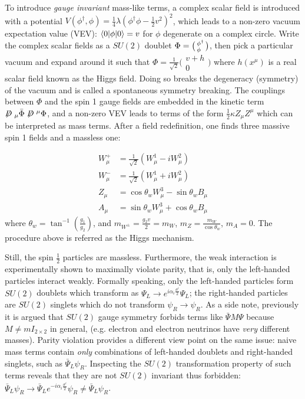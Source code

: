 To introduce \emph{gauge invariant} mass-like terms,
a complex scalar field is introduced with a potential
$V(\phi^\dagger, \phi) = \frac{1}{4}\lambda \left(\phi^\dagger \phi - \frac{1}{2}v^2\right)^2$,
which leads to a non-zero vacuum expectation value (VEV):
$\langle0\rvert\phi\lvert0\rangle = v$ for $\phi$ degenerate on a complex circle.
Write the complex scalar fields as a $SU(2)$ doublet
$\Phi = \bigl(\begin{smallmatrix} \phi^\dagger \\ \phi^{\hphantom{\dagger}} \end{smallmatrix}\bigr)$,
then pick a particular vacuum and expand around it such that
$\Phi = \frac{1}{\sqrt{2}} \bigl(\begin{smallmatrix} v + h \\ 0 \end{smallmatrix}\bigr)$
where $h(x^\mu)$ is a real scalar field known as the Higgs field.
Doing so breaks the degeneracy (symmetry) of the vacuum and is called a
spontaneous symmetry breaking.
The couplings between $\Phi$ and the spin 1 gauge fields are embedded in the
kinetic term $\fsl{D}_\mu \bar\Phi \fsl{D}^\mu \Phi$,
and a non-zero VEV leads to terms of the form $\frac{1}{2}\kappa Z_\mu Z^\mu$ which
can be interpreted as mass terms.
After a field redefinition, one finds three massive spin 1 fields and a massless
one:

\begin{align}
    W^+_\mu &= \frac{1}{\sqrt{2}}(W^1_\mu - i W^2_\mu) \\
    W^-_\mu &= \frac{1}{\sqrt{2}}(W^1_\mu + i W^2_\mu) \\
    Z_\mu &= \cos\theta_w W^3_\mu - \sin\theta_w B_\mu \\
    A_\mu &= \sin\theta_w W^3_\mu + \cos\theta_w B_\mu
\end{align}
where $\theta_w = \tan^{-1}\left(\frac{g_1}{g_2}\right)$,
and $m_{W^\pm} = \frac{g_2 v}{2} = m_W$, $m_Z = \frac{m_W}{\cos\theta_w}$,
$m_A = 0$.
The procedure above is referred as the Higgs mechanism.

Still, the spin $\frac{1}{2}$ particles are massless.
Furthermore, the weak interaction is experimentally shown to maximally violate
parity,
that is, only the left-handed particles interact weakly.
Formally speaking, only the left-handed particles form $SU(2)$ doublets
which transform as
$\Psi_L \rightarrow e^{i \alpha_i \frac{\sigma^i}{2}} \Psi_L$;
the right-handed particles are $SU(2)$ singlets which do not transform
$\psi_R \rightarrow \psi_R$.
As a side note, previously it is argued that $SU(2)$ gauge symmetry forbids
terms like $\bar{\Psi} M \Psi$ because $M \neq m I_{2 \times 2}$ in
general,
(e.g. electron and electron neutrinos have \emph{very} different masses).
Parity violation provides a different view point on the same issue:
naive mass terms contain \emph{only} combinations of left-handed doublets
and right-handed singlets, such as $\bar{\Psi}_L \psi_R$.
Inspecting the $SU(2)$ transformation property of such terms reveals that
they are not $SU(2)$ invariant thus forbidden:
$\bar{\Psi}_L \psi_R \rightarrow \bar{\Psi}_L e^{-i \alpha_i \frac{\sigma^i}{2}} \psi_R \neq \bar{\Psi}_L \psi_R$.

